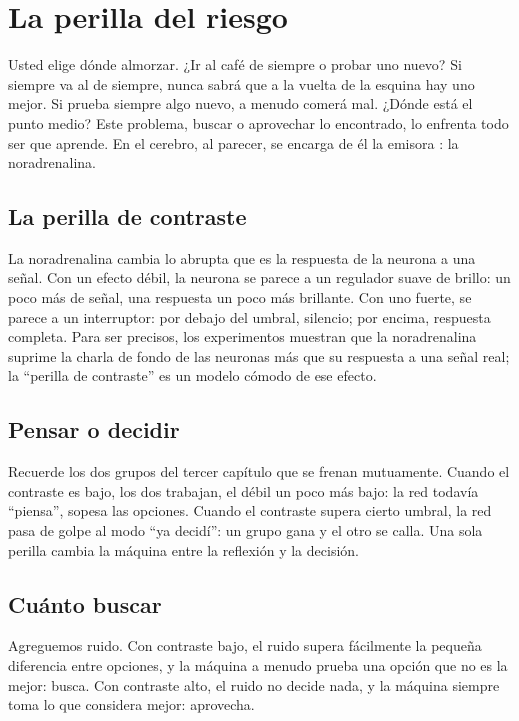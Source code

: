 \chapter{La perilla del riesgo}

Usted elige dónde almorzar. ¿Ir al café de siempre o probar uno nuevo? Si siempre va al de siempre, nunca sabrá que a la vuelta de la esquina hay uno mejor. Si prueba siempre algo nuevo, a menudo comerá mal. ¿Dónde está el punto medio? Este problema, buscar o aprovechar lo encontrado, lo enfrenta todo ser que aprende. En el cerebro, al parecer, se encarga de él la emisora : la noradrenalina.

\section*{La perilla de contraste}

La noradrenalina cambia lo abrupta que es la respuesta de la neurona a una señal. Con un efecto débil, la neurona se parece a un regulador suave de brillo: un poco más de señal, una respuesta un poco más brillante. Con uno fuerte, se parece a un interruptor: por debajo del umbral, silencio; por encima, respuesta completa. Para ser precisos, los experimentos muestran que la noradrenalina suprime la charla de fondo de las neuronas más que su respuesta a una señal real; la “perilla de contraste” es un modelo cómodo de ese efecto.


\section*{Pensar o decidir}

Recuerde los dos grupos del tercer capítulo que se frenan mutuamente. Cuando el contraste es bajo, los dos trabajan, el débil un poco más bajo: la red todavía “piensa”, sopesa las opciones. Cuando el contraste supera cierto umbral, la red pasa de golpe al modo “ya decidí”: un grupo gana y el otro se calla. Una sola perilla cambia la máquina entre la reflexión y la decisión.

\section*{Cuánto buscar}

Agreguemos ruido. Con contraste bajo, el ruido supera fácilmente la pequeña diferencia entre opciones, y la máquina a menudo prueba una opción que no es la mejor: busca. Con contraste alto, el ruido no decide nada, y la máquina siempre toma lo que considera mejor: aprovecha.

